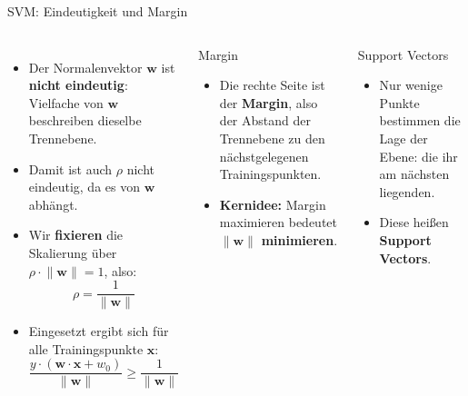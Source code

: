 \begin{frame}{SVM: Eindeutigkeit und Margin}
\begin{columns}

\footnotesize
\begin{itemize}
  \item Der Normalenvektor $\mathbf{w}$ ist \textbf{nicht eindeutig}:
        Vielfache von $\mathbf{w}$ beschreiben dieselbe Trennebene.
  \item Damit ist auch $\rho$ nicht eindeutig, da es von $\mathbf{w}$
        abhängt.
  \item Wir \textbf{fixieren} die Skalierung über
        $\rho \cdot \lVert \mathbf{w} \rVert = 1$, also:
        \[
          \rho = \frac{1}{\lVert \mathbf{w} \rVert}
        \]
  \item Eingesetzt ergibt sich für alle Trainingspunkte $\mathbf{x}$:
        \[
          \frac{y\cdot(\mathbf{w}\cdot\mathbf{x} + w_0)}{\lVert \mathbf{w} \rVert}
          \geq \frac{1}{\lVert \mathbf{w} \rVert}
        \]
\end{itemize}

\footnotesize
\begin{blockC1}{\footnotesize   Margin}
\begin{itemize}
  \item Die rechte Seite ist der \textbf{Margin}, also der Abstand der
        Trennebene zu den nächstgelegenen Trainingspunkten.
  \item \textbf{Kernidee:} Margin maximieren bedeutet
        $\lVert \mathbf{w} \rVert$ \textbf{minimieren}.
\end{itemize}
\end{blockC1}

\begin{blockC2}{\footnotesize Support Vectors}
\begin{itemize}
  \item Nur wenige Punkte bestimmen die Lage der Ebene: die ihr am nächsten
        liegenden.
  \item Diese heißen \textbf{Support Vectors}.
\end{itemize}
\end{blockC2}

\end{columns}
\end{frame}


